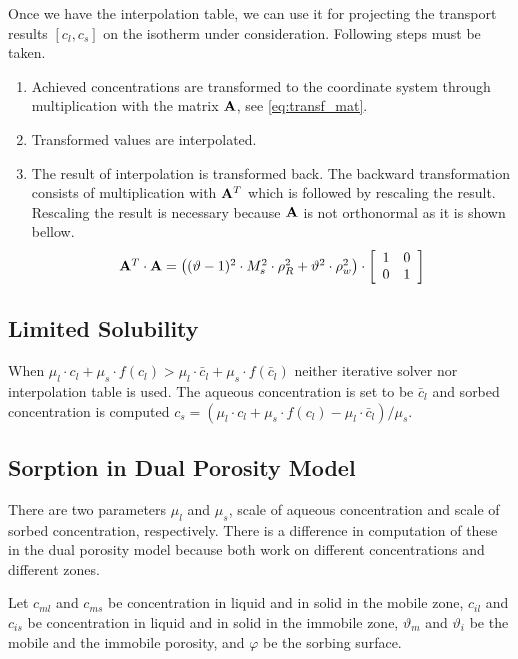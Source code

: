 Once we have the interpolation table, we can use it for projecting the transport results ${[c_l,c_s]}$ on the 
isotherm under consideration. Following steps must be taken.
\begin{enumerate}
 \item Achieved concentrations are transformed to the coordinate system through multiplication with the 
       matrix ${\bf A}$, see \eqref{eq:transf_mat}.
 \item Transformed values are interpolated.
 \item The result of interpolation is transformed back. The backward transformation consists of multiplication 
       with ${\bf A}^T$ which is followed by rescaling the result. Rescaling the result is necessary because  
       ${\bf A}$ is not orthonormal as it is shown bellow.
 \[
 \begin{array}{l}
 {\bf A}^T\cdot{\bf A} =
  \left((\vartheta - 1)^2\cdot M_s^2\cdot \rho_R^2 + \vartheta^2\cdot \rho_w^2\right)\cdot\left[\begin{array}{cc}
    1 & 0\\
    0 & 1
  \end{array}\right]
  \end{array}
 \]
\end{enumerate}


\subsection{Limited Solubility}\label{subsec:lim_solub}
When $\mu_l\cdot c_l + \mu_s\cdot f(c_l) > \mu_l\cdot \bar{c}_l + \mu_s\cdot f(\bar{c}_l)$ neither iterative 
solver nor interpolation table is used. The aqueous concentration is set to be $\bar{c}_l$ and sorbed 
concentration is computed $c_s = (\mu_l\cdot c_l + \mu_s\cdot f(c_l) - \mu_l\cdot \bar{c}_l)/\mu_s$.

\subsection{Sorption in Dual Porosity Model} 
\label{subsec:sorp_dual_por}
There are two parameters $\mu_l$ and $\mu_s$, scale of aqueous concentration and scale of sorbed concentration, respectively.  
There is a difference in computation of these in the dual porosity model because both work on different concentrations
and different zones.

Let $c_{ml}$ and $c_{ms}$ be concentration in liquid and in solid in the mobile zone, 
$c_{il}$ and $c_{is}$ be concentration in liquid and in solid in the immobile zone,
$\vartheta_m$ and $\vartheta_i$ be the mobile and the immobile porosity,
and $\varphi$ be the sorbing surface.

